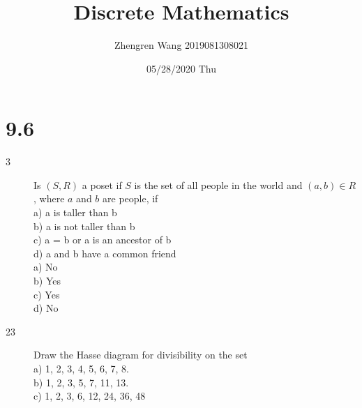 \documentclass[UTF8]{article}
\title{Discrete Mathematics}
\author{Zhengren Wang 2019081308021}
\date{05/28/2020 Thu }
\begin{document}
\maketitle

\part{9.6}
\begin{description}
    \item[3]Is $(S, R)$ a poset if $S$ is the set of all people in the world and $(a, b)\in R$, where $a$ and $b$ are people, if  \\
            a) a is taller than b             \\
            b) a is not taller than b         \\
            c) a = b or a is an ancestor of b \\
            d) a and b have a common friend   \\
            
            a) No          \\
            b) Yes         \\
            c) Yes         \\
            d) No          \\
            

    \item[23]Draw the Hasse diagram for divisibility on the set  \\

            a) {1, 2, 3, 4, 5, 6, 7, 8}.    \\
            b) {1, 2, 3, 5, 7, 11, 13}.     \\
            c) {1, 2, 3, 6, 12, 24, 36, 48} \\


\end{description}
\end{document}
